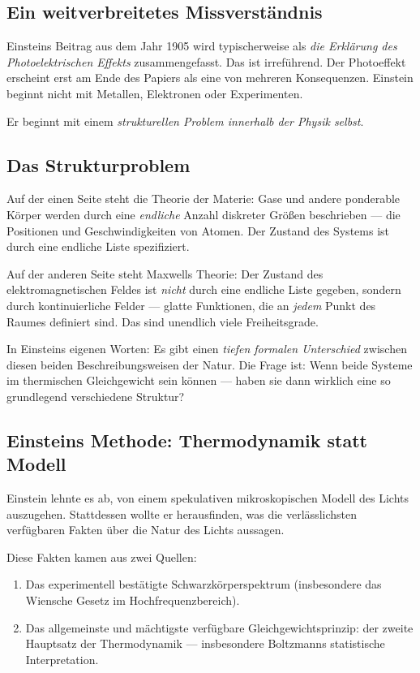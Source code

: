 \subsection{Ein weitverbreitetes Missverständnis}

Einsteins Beitrag aus dem Jahr 1905 wird typischerweise als \emph{die Erklärung des 
Photoelektrischen Effekts} zusammengefasst. Das ist irreführend. Der Photoeffekt 
erscheint erst am Ende des Papiers als eine von mehreren Konsequenzen. Einstein beginnt 
nicht mit Metallen, Elektronen oder Experimenten.

Er beginnt mit einem \emph{strukturellen Problem innerhalb der Physik selbst}.

\subsection{Das Strukturproblem}

Auf der einen Seite steht die Theorie der Materie: Gase und andere ponderable Körper 
werden durch eine \emph{endliche} Anzahl diskreter Größen beschrieben — die Positionen 
und Geschwindigkeiten von Atomen. Der Zustand des Systems ist durch eine endliche 
Liste spezifiziert.

Auf der anderen Seite steht Maxwells Theorie: Der Zustand des elektromagnetischen 
Feldes ist \emph{nicht} durch eine endliche Liste gegeben, sondern durch kontinuierliche 
Felder — glatte Funktionen, die an \emph{jedem} Punkt des Raumes definiert sind. 
Das sind unendlich viele Freiheitsgrade.

In Einsteins eigenen Worten: Es gibt einen \emph{tiefen formalen Unterschied} zwischen 
diesen beiden Beschreibungsweisen der Natur. Die Frage ist: Wenn beide Systeme im 
thermischen Gleichgewicht sein können — haben sie dann wirklich eine so grundlegend 
verschiedene Struktur?

\subsection{Einsteins Methode: Thermodynamik statt Modell}

Einstein lehnte es ab, von einem spekulativen mikroskopischen Modell des Lichts 
auszugehen. Stattdessen wollte er herausfinden, was die verlässlichsten verfügbaren 
Fakten über die Natur des Lichts aussagen.

Diese Fakten kamen aus zwei Quellen:
\begin{enumerate}
    \item Das experimentell bestätigte Schwarzkörperspektrum (insbesondere das Wiensche 
    Gesetz im Hochfrequenzbereich).
    \item Das allgemeinste und mächtigste verfügbare Gleichgewichtsprinzip: der zweite 
    Hauptsatz der Thermodynamik — insbesondere Boltzmanns statistische Interpretation.
\end{enumerate}

